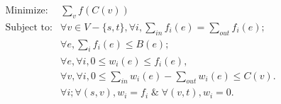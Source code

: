 \documentclass[11pt]{article}
\begin{document}
\begin{subequations}
\begin{align}
\text{Minimize:}&\sum\limits_v f(C(v))\\
\text{Subject to:}&\forall v \in V-\{s, t\}, \forall i, \sum\limits_{in}  f_i(e)=  \sum\limits_{out} f_i(e);\\
&\forall e, \sum\limits_{i} f_{i}(e)\leq B(e);\\
&\forall e,\forall  i,0 \leq w_i(e) \leq f_i(e),\\
&\forall v,\forall  i, 0\leq \sum\limits_{in } w_i(e) - \sum\limits_{out} w_i(e)   \leq{C(v)}.\\
&\forall  i; \forall (s, v), w_i = f_i\;\&\; \forall (v,t), w_i =0.
\end{align}
\end{subequations}







\appendix
\end{document}
